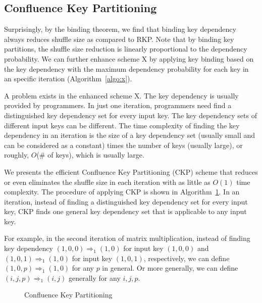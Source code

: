 \documentclass[10pt,journal,compsoc]{IEEEtran}
\makeatletter
\newcommand{\removelatexerror}{\let\@latex@error\@gobble}
\makeatother
\begin{document}
\subsection{Confluence Key Partitioning}\label{section:ckp}
Surprisingly, by the binding theorem, we find that
binding key dependency always reduces shuffle size as compared to RKP. 
Note that by binding key partitions, the shuffle size reduction is 
linearly proportional to the dependency probability. 
We can further enhance scheme X 
by applying key binding based on the key dependency with the 
maximum dependency probability for each key in an specific iteration (Algorithm~\ref{algo:x}). 

A problem exists in the enhanced scheme X. 
The key dependency is usually provided by programmers.
In just one iteration, programmers need find a distinguished
key dependency set for every input key. 
The key dependency sets of different input keys can be different. 
The time complexity of finding the key dependency in an iteration is the size of a key dependency set (usually small and can be considered as a constant) 
times the number of keys (usually large), 
or roughly, $O$(\# of keys), which is usually large. 


We presents the efficient Confluence Key Partitioning (CKP) scheme that 
reduces or even eliminates 
the shuffle size in each iteration with as little as $O(1)$ time complexity. 
The procedure of applying CKP is shown in Algorithm~\ref{algo:CKP}.
In an iteration, instead of finding a distinguished key dependency set for 
every input key, CKP finds one general key dependency set that is applicable 
to any input key. 

For example, in the second iteration of matrix multiplication, 
instead of finding key dependency $(1, 0, 0) \Rightarrow_{1} (1, 0)$ 
for input key $(1,0,0)$ and $(1,0,1) \Rightarrow_{1} (1,0)$ 
for input key $(1,0,1)$, respectively, 
we can define $(1, 0, p) \Rightarrow_{1} (1,0)$ for any $p$ in general. 
Or more generally, we can define $(i, j, p) \Rightarrow_{1} (i, j)$ 
generally for any $i, j, p$. 

\begin{figure}[!t]
\removelatexerror

\begin{algorithm}[H]

\caption{Confluence Key Partitioning}
\label{algo:CKP}
\end{algorithm}
\end{figure}
\end{document}
